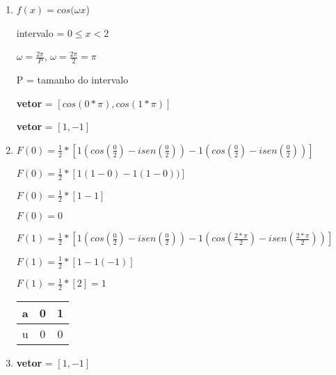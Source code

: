 \begin{question}

	\begin{enumerate}[label=\textbf{\alph*})]

		\item 
		
		$f(x) = cos (\omega x$)

		intervalo = $0 \leq x < 2$ 

		$\omega = \frac{2\pi}{P}$, $\omega = \frac{2\pi}{2} = \pi$
  
		P = tamanho do intervalo

		\textbf{vetor} = $[ cos(0*\pi), cos(1*\pi) ]$

		\textbf{vetor} = $[ 1, -1 ]$

  		\item 
		  
		$F(0) = \frac{1}{2} * [ 1(cos(\frac{0}{2}) - i sen(\frac{0}{2})) -1(cos(\frac{0}{2}) - i sen(\frac{0}{2})) ]$

		$F(0) = \frac{1}{2} * [ 1(1 - 0) -1(1 - 0)) ]$

		$F(0) = \frac{1}{2} * [ 1-1 ]$

		$F(0) = 0$ 

		\vspace*{0.5cm}

		$F(1) = \frac{1}{2} * [ 1(cos(\frac{0}{2}) - i sen(\frac{0}{2})) -1(cos(\frac{2*\pi}{2}) - i sen(\frac{2*\pi}{2})) ]$

		$F(1) = \frac{1}{2} * [ 1 -1(-1 ) ]$

		$F(1) = \frac{1}{2} * [ 2 ] = 1$ 
		
		\begin{minipage}{\linewidth}
			\centering 
			\begin{tabular}{|c|c|c|}
				\hline
				a & 0 & 1 \\
				\hline
				u & 0 & 0 \\
				\hline
			\end{tabular}

		\end{minipage}

    	\item
        
		\textbf{vetor} = $[ 1, -1 ]$

		\begin{minipage}{\linewidth}
			\centering 
		\end{minipage}

	\end{enumerate}

\end{question}
